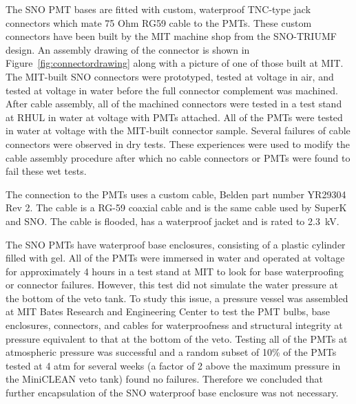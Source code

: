 \documentclass[review,number,sort&compress]{elsarticle}
\begin{document}
The SNO PMT bases are fitted with custom, waterproof TNC-type jack
connectors which mate 75 Ohm RG59 cable to the PMTs. These custom
connectors have been built by the MIT machine shop from the SNO-TRIUMF
design. An assembly drawing of the connector is shown in
Figure~\ref{fig:connectordrawing} along with a picture of one of those
built at MIT. The MIT-built SNO
connectors were prototyped, tested at voltage in air, and tested at
voltage in water before the full connector complement was machined.
After cable assembly, all of the machined connectors were tested in
a test stand at RHUL in water at voltage with PMTs attached. All of the
PMTs were tested in water at voltage with the MIT-built connector
sample. Several failures of cable connectors were observed in dry
tests. These experiences were used to modify the cable assembly
procedure after which no cable connectors or PMTs were found to fail
these wet tests.


The connection to the PMTs uses a custom cable, Belden part number YR29304 Rev 2. The cable is a
RG-59 coaxial cable and is the same cable used by SuperK and SNO.
The cable is flooded, has a waterproof jacket and is rated to 2.3~kV.

The SNO PMTs have waterproof base enclosures, consisting of a plastic
cylinder filled with gel. All of the PMTs were immersed in water and
operated at voltage for approximately 4 hours in a test stand at MIT
to look for base waterproofing or connector failures. However, this
test did not simulate the water pressure at the bottom of the veto
tank. To study this issue, a pressure vessel was assembled at MIT
Bates Research and Engineering Center to test the PMT bulbs, base
enclosures, connectors, and cables for waterproofness and structural
integrity at pressure equivalent to that at the bottom of the veto.
Testing all of the PMTs at atmospheric pressure was successful and a
random subset of 10\% of the PMTs tested at 4 atm for several weeks (a
factor of 2 above the maximum pressure in the MiniCLEAN veto tank)
found no failures. Therefore we concluded that further encapsulation
of the SNO waterproof base enclosure was not necessary.
\end{document}
